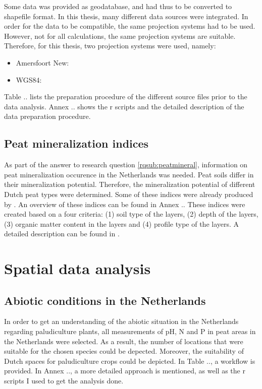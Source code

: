 \documentclass[a4paper,12pt]{scrbook}
\begin{document}
Some data was provided as geodatabase, and had thus to be converted to shapefile format. In this thesis, many different data sources were integrated. In order for the data to be compatible, the same projection systems had to be used. However, not for all calculations, the same projection systems are suitable. Therefore, for this thesis, two projection systems were used, namely:


\begin{itemize}
\item Amersfoort New: 
\item WGS84: 
\end{itemize}

Table .. lists the preparation procedure of the different source files prior to the data analysis. Annex .. shows the r scripts and the detailed description of the data preparation procedure.

\subsection{Peat mineralization indices}

As part of the answer to research question \ref{rqsub:peatmineral}, information on peat mineralization occurence in the Netherlands was needed. Peat soils differ in their mineralization potential. Therefore, the mineralization potential of different Dutch peat types were determined. Some of these indices  were already produced by \citep{stouthamer2008toelichting}. An overview of these indices can be found in Annex .. These indices were created based on a four criteria: (1) soil type of the layers, (2) depth of the layers, (3) organic matter content in the layers and (4) profile type of the layers. A detailed description can be found in \citep{stouthamer2008toelichting}.

\section{Spatial data analysis}

\subsection{Abiotic conditions in the Netherlands}

In order to get an understanding of the abiotic situation in the Netherlands regarding paludiculture plants, all measurements of pH, \ac{N} and \ac{P} in peat areas in the Netherlands were selected. As a result, the number of locations that were suitable for the chosen species could be depected. Moreover, the suitability of Dutch spaces for paludiculture crops could be depicted. In Table .., a workflow is provided. In Annex .., a more detailed approach is mentioned, as well as the r scripts I used to get the analysis done.
\end{document}

